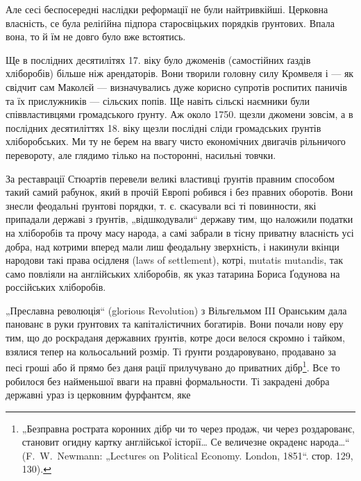 Але сесі беспосередні наслідки реформації не були
найтривкійші. Церковна власність, се була реліґійна підпора
старосвіцьких порядків ґрунтових. Впала вона, то й їм не
довго було вже встоятись.

Ще в послідних десятилітях 17. віку було джоменів
(самостійних ґаздів хліборобів) більше ніж арендаторів.
Вони творили головну силу Кромвеля і — як свідчит сам
Маколєй — визначувались дуже корисно супротів роспитих
паничів та їх прислужників — сільских попів. Ще навіть
сільскі наємники були співвластивцями громадського ґрунту.
Аж около 1750. щезли джомени зовсім, а в послідних десятиліттях
18. віку щезли послідні сліди громадських ґрунтів
хліборобських. Ми ту не берем на ввагу чисто економічних
двигачів рільничого перевороту, але глядимо тілько на пoсторонні,
насильні товчки.

За реставрації Стюартів перевели великі властивці
ґрунтів правним способом такий самий рабунок, який в прочій
Европі робився і без правних оборотів. Вони знесли
феодальні ґрунтові порядки, т. є. скасували всі ті повинности,
які припадали державі з ґрунтів, „відшкодували“ державу
тим, що наложили податки на хліборобів та прочу
масу народа, а самі забрали в тісну приватну власність усі
добра, над котрими вперед мали лиш феодальну зверхність,
і накинули вкінци народови такі права осідленя (laws of
settlement), котрі, mutatis mutandis, так само повліяли на
англійських хліборобів, як указ татарина Бориса Ґодунова
на россійських хліборобів.

„Преславна революція“ (glorious Revolution) з Вільгельмом
III Оранським дала панованє в руки ґрунтових та капіталістичних
богатирів. Вони почали нову еру тим, що до
роскраданя державних ґрунтів, котре доси велося скромно
і тайком, взялися тепер на кольосальний розмір. Ті ґрунти
роздаровувано, продавано за песі гроші або й прямо без
даня рації прилучувано до приватних дібр\footnote{
„Безправна рострата коронних дібр чи то через продаж, чи через
роздарованє, становит огидну картку англійської історії\dots{} Се величезне
окраденє народа\dots{}“ (F.~W.~Newmann: „Lectures on Political Economy.
London, 1851“. стор. 129, 130).
}. Все то робилося
без найменьшої вваги на правні формальности. Ті закрадені
добра державні ураз із церковним фурфантєм, яке
\parbreak{}
